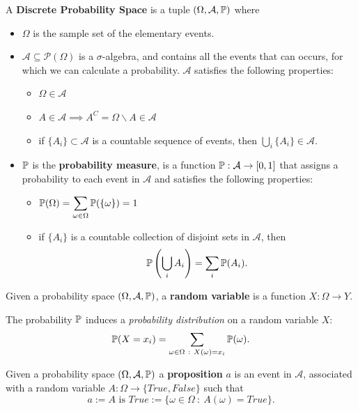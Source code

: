 \documentclass[10pt, letterpaper]{report}
\begin{document}
\begin{definition}
    A \textbf{Discrete Probability Space} is a tuple $(\Omega,\mathcal A,{\mathbb P})$ where\begin{itemize}
        \item $\Omega$ is the sample set of the elementary events.
        \item $\mathcal A\subseteq\mathcal P(\Omega)$ is a $\sigma$-algebra, and contains all the events that can occurs, for which we can calculate a probability. $\mathcal A$ satisfies the following properties:\begin{itemize}
            \item $\Omega\in\mathcal A$
            \item $A\in\mathcal A\implies A^C=\Omega\backslash A\in \mathcal A$
            \item if $\{A_i\}\subset\mathcal A$ is a countable sequence of events, then $\bigcup_i\{A_i\}\in\mathcal A$.
        \end{itemize}
        \item ${\mathbb P}$ is the \textbf{probability measure}, is a function ${\mathbb P}:\mathcal A\rightarrow[0,1]$ that assigns a probability to each event in $\mathcal A$ and satisfies the following properties:\begin{itemize}
            \item ${\mathbb P}(\Omega)=\displaystyle\sum_{\omega\in\Omega}{\mathbb P}(\{\omega\})=1$
            \item if $\{A_i\}$ is a countable collection of disjoint sets in $\mathcal A$, then\begin{equation}
                {\mathbb P}\left(\bigcup_{i}A_i\right)=\sum_i{\mathbb P}(A_i).
            \end{equation}
        \end{itemize}
    \end{itemize}
\end{definition}
\begin{definition}
    Given a probability space $(\Omega,\mathcal A,{\mathbb P})$, a \textbf{random variable} is a function $X:\Omega\rightarrow Y$.
\end{definition}
The probability ${\mathbb P}$ induces a \textit{probability distribution} on a random variable $X$:\begin{equation}
    \Prob(X=x_i)=\sum_{\omega\in\Omega \ : \ X(\omega)=x_i}\Prob(\omega).
\end{equation}
\begin{definition}
    Given a probability space $(\Omega,\mathcal A,{\mathbb P})$ a \textbf{proposition} $a$ is an event in $\mathcal A$, associated with a random variable $A:\Omega\rightarrow\{True,False\} $ such that\begin{equation}
        a := A \text{ is } True := \{\omega\in\Omega \ : \ A(\omega)=True\}.
    \end{equation}
\end{definition}
\end{document}
